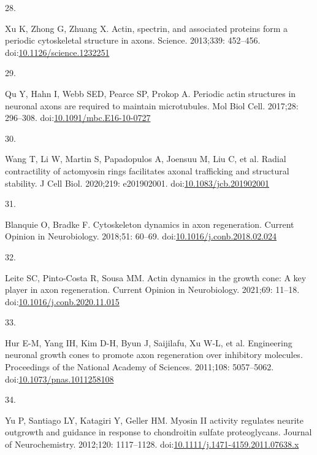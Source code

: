 \documentclass[
  12pt,
  a4paper,
]{book}
\newlength{\cslhangindent}
\newlength{\csllabelwidth}
\newlength{\cslentryspacingunit} %
\newenvironment{CSLReferences}[2] %
 {%
  \setlength{\parindent}{0pt}
  \ifodd #1
  \let\oldpar\par
  \def\par{\hangindent=\cslhangindent\oldpar}
  \fi
  \setlength{\parskip}{#2\cslentryspacingunit}
 }%
 {}
\newcommand{\CSLLeftMargin}[1]{\parbox[t]{\csllabelwidth}{#1}}
\newcommand{\CSLRightInline}[1]{\parbox[t]{\linewidth - \csllabelwidth}{#1}\break}
\begin{document}
\begin{CSLReferences}{0}{0}
\leavevmode{}%
\CSLLeftMargin{28. }%
\CSLRightInline{Xu K, Zhong G, Zhuang X. Actin, spectrin, and associated proteins form a periodic cytoskeletal structure in axons. Science. 2013;339: 452--456. doi:\href{https://doi.org/10.1126/science.1232251}{10.1126/science.1232251}}

\leavevmode{}%
\CSLLeftMargin{29. }%
\CSLRightInline{Qu Y, Hahn I, Webb SED, Pearce SP, Prokop A. Periodic actin structures in neuronal axons are required to maintain microtubules. Mol Biol Cell. 2017;28: 296--308. doi:\href{https://doi.org/10.1091/mbc.E16-10-0727}{10.1091/mbc.E16-10-0727}}

\leavevmode{}%
\CSLLeftMargin{30. }%
\CSLRightInline{Wang T, Li W, Martin S, Papadopulos A, Joensuu M, Liu C, et al. Radial contractility of actomyosin rings facilitates axonal trafficking and structural stability. J Cell Biol. 2020;219: e201902001. doi:\href{https://doi.org/10.1083/jcb.201902001}{10.1083/jcb.201902001}}

\leavevmode{}%
\CSLLeftMargin{31. }%
\CSLRightInline{Blanquie O, Bradke F. Cytoskeleton dynamics in axon regeneration. Current Opinion in Neurobiology. 2018;51: 60--69. doi:\href{https://doi.org/10.1016/j.conb.2018.02.024}{10.1016/j.conb.2018.02.024}}

\leavevmode{}%
\CSLLeftMargin{32. }%
\CSLRightInline{Leite SC, Pinto-Costa R, Sousa MM. Actin dynamics in the growth cone: A key player in axon regeneration. Current Opinion in Neurobiology. 2021;69: 11--18. doi:\href{https://doi.org/10.1016/j.conb.2020.11.015}{10.1016/j.conb.2020.11.015}}

\leavevmode{}%
\CSLLeftMargin{33. }%
\CSLRightInline{Hur E-M, Yang IH, Kim D-H, Byun J, Saijilafu, Xu W-L, et al. Engineering neuronal growth cones to promote axon regeneration over inhibitory molecules. Proceedings of the National Academy of Sciences. 2011;108: 5057--5062. doi:\href{https://doi.org/10.1073/pnas.1011258108}{10.1073/pnas.1011258108}}

\leavevmode{}%
\CSLLeftMargin{34. }%
\CSLRightInline{Yu P, Santiago LY, Katagiri Y, Geller HM. Myosin {II} activity regulates neurite outgrowth and guidance in response to chondroitin sulfate proteoglycans. Journal of Neurochemistry. 2012;120: 1117--1128. doi:\href{https://doi.org/10.1111/j.1471-4159.2011.07638.x}{10.1111/j.1471-4159.2011.07638.x}}


\end{CSLReferences}
\end{document}
